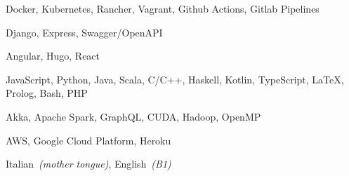 

\begin{cvskills}

    {Docker, Kubernetes, Rancher, Vagrant, Github Actions, Gitlab Pipelines} %

    {Django, Express, Swagger/OpenAPI} %

    {Angular, Hugo, React} %

    {JavaScript, Python, Java, Scala, C/C++, Haskell, Kotlin, TypeScript, LaTeX, Prolog, Bash, PHP} %

    {Akka, Apache Spark, GraphQL, CUDA, Hadoop, OpenMP}

    {AWS, Google Cloud Platform, Heroku}

    {Italian~\textit{(mother tongue)}, English~\textit{(B1)}} %

\end{cvskills}
